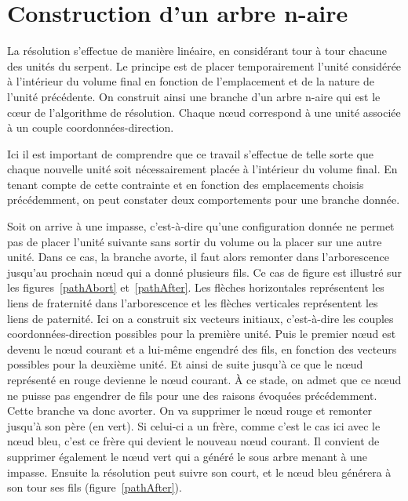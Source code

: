 \clearpage
\section{Construction d’un arbre n-aire}\label{solveNode}
La résolution s’effectue de manière linéaire, en considérant tour à tour chacune des unités du serpent. Le principe est de placer temporairement l’unité considérée à l’intérieur du volume final en fonction de l’emplacement et de la nature de l’unité précédente. On construit ainsi une branche d’un arbre n-aire qui est le cœur de l’algorithme de résolution. Chaque nœud correspond à une unité associée à un couple coordonnées-direction.

Ici il est important de comprendre que ce travail s’effectue de telle sorte que chaque nouvelle unité soit nécessairement placée à l’intérieur du volume final. En tenant compte de cette contrainte et en fonction des emplacements choisis précédemment, on peut constater deux comportements pour une branche donnée. 

Soit on arrive à une impasse, c’est-à-dire qu’une configuration donnée ne permet pas de placer l’unité suivante sans sortir du volume ou la placer sur une autre unité. Dans ce cas, la branche avorte, il faut alors remonter dans l’arborescence jusqu’au prochain nœud qui a donné plusieurs fils. Ce cas de figure est illustré sur les figures~\ref{pathAbort} et~\ref{pathAfter}. Les flèches horizontales représentent les liens de fraternité dans l’arborescence et les flèches verticales représentent les liens de paternité. Ici on a construit six vecteurs initiaux, c’est-à-dire les couples coordonnées-direction possibles pour la première unité. Puis le premier nœud est devenu le nœud courant et a lui-même engendré des fils, en fonction des vecteurs possibles pour la deuxième unité. Et ainsi de suite jusqu’à ce que le nœud représenté en rouge devienne le nœud courant. À ce stade, on admet que ce nœud ne puisse pas engendrer de fils pour une des raisons évoquées précédemment. Cette branche va donc avorter. On va supprimer le nœud rouge et remonter jusqu’à son père (en vert). Si celui-ci a un frère, comme c’est le cas ici avec le nœud bleu, c’est ce frère qui devient le nouveau nœud courant. Il convient de supprimer également le nœud vert qui a généré le sous arbre menant à une impasse.  Ensuite la résolution peut suivre son court, et le nœud bleu générera à son tour ses fils (figure~\ref{pathAfter}).

